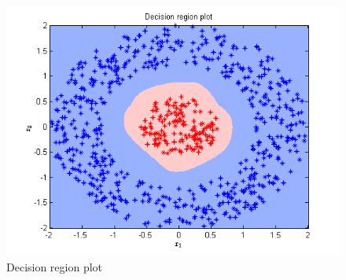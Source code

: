 \documentclass{article}
\begin{document}
\begin{figure}[H]
\centering
\includegraphics[width=\linewidth]{Classification/nonlinearlySeparable/decn_region_bayes.png}
\caption{Decision region plot}
\end{figure}
\end{document}
